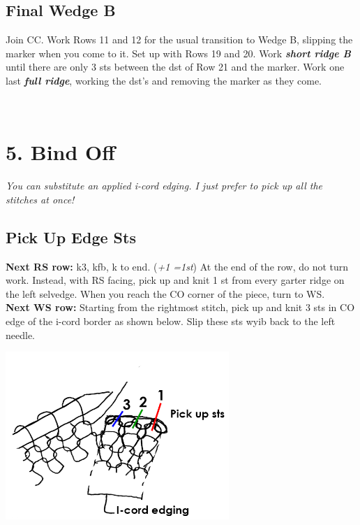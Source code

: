 \documentclass[12pt]{article}
\newcommand{\vocab}[1]{\emph{\textbf{#1}}} %
\newcommand{\rowDir}[1]{\textbf{#1:}} %
\newcommand{\increase}[1]{(\emph{+#1 
	\ifnum#1=1{st}\else{sts}\fi})}
\begin{document}
\begin{multicols}{2}
\subsection*{Final Wedge B}

Join CC. Work Rows 11 and 12 for the usual transition to Wedge B, slipping the marker when you come to it. Set up with Rows 19 and 20. Work \vocab{short ridge B} until there are only 3 sts between the dst of Row 21 and the marker. Work one last \vocab{full ridge}, working the dst's and removing the marker as they come.

\vfill ~\\
\columnbreak

\section*{5. Bind Off}

\emph{You can substitute an applied i-cord edging. I just prefer to pick up all the stitches at once!} \vspace{-1em}

\subsection*{Pick Up Edge Sts}
\rowDir{Next RS row} k3, kfb, k to end. \increase{1} At the end of the row, do not turn work. Instead, with RS facing, pick up and knit 1 st from every garter ridge on the left selvedge. When you reach the CO corner of the piece, turn to WS. \\
\rowDir{Next WS row} Starting from the rightmost stitch, pick up and knit 3 sts in CO edge of the i-cord border as shown below. Slip these sts wyib back to the left needle.

\begin{center}
\vspace{-2em}
\includegraphics[height=2.5in]{pickup.png}
\end{center}


\end{multicols}
\end{document}
